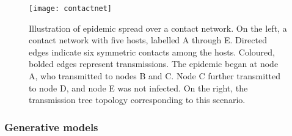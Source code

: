 \begin{figure}[ht]
  \centering
  \label{fig:contactnet}
  \texttt{[image: contactnet]}
  \caption[Illustration of a epidemic spread over a contact network]
  {Illustration of epidemic spread over a contact network. On the left, a
   contact network with five hosts, labelled A through E. Directed edges
   indicate six symmetric contacts among the hosts. Coloured, bolded edges
   represent transmissions. The epidemic began at node A, who transmitted to
   nodes B and C. Node C further transmitted to node D, and node E was not
   infected. On the right, the transmission tree topology corresponding to this
   scenario.}
\end{figure}

\subsubsection{Generative models}

